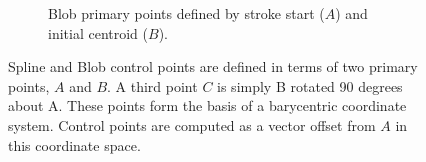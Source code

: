 \begin{figure}
\begin{subfigure}[t]{0.42\textwidth}
    \caption{Blob primary points defined by stroke start ($A$) and
      initial centroid ($B$).}
    \label{fig:barycentric-blob}
  \end{subfigure}
  \caption[Spline and Blob control points]{Spline and Blob control
    points are defined in terms of two primary points, $A$ and $B$. A
    third point $C$ is simply B rotated 90 degrees about A. These
    points form the basis of a barycentric coordinate system. Control
    points are computed as a vector offset from $A$ in this coordinate
    space.}
  \label{fig:spline-blob-control-points}
\end{figure}

